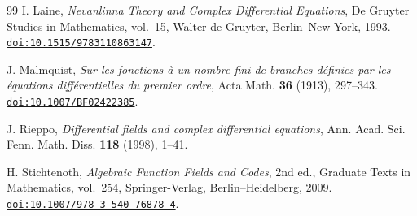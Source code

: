 \documentclass[11pt,reqno]{amsart}
\numberwithin{equation}{section}
\theoremstyle{definition}
\theoremstyle{remark}
\newcommand{\doi}[1]{\href{https://doi.org/#1}{\nolinkurl{doi:#1}}}
\begin{document}
\begin{thebibliography}{99}
I. Laine,
\emph{Nevanlinna Theory and Complex Differential Equations},
De Gruyter Studies in Mathematics, vol.~15, Walter de Gruyter,
Berlin--New York, 1993.
\doi{10.1515/9783110863147}.

J. Malmquist,
\emph{Sur les fonctions \`a un nombre fini de branches d\'efinies par les
\'equations diff\'erentielles du premier ordre},
Acta Math. \textbf{36} (1913), 297--343.
\doi{10.1007/BF02422385}.

J. Rieppo,
\emph{Differential fields and complex differential equations},
Ann. Acad. Sci. Fenn. Math. Diss. \textbf{118} (1998), 1--41.

H. Stichtenoth,
\emph{Algebraic Function Fields and Codes}, 2nd ed.,
Graduate Texts in Mathematics, vol.~254,
Springer-Verlag, Berlin--Heidelberg, 2009.
\doi{10.1007/978-3-540-76878-4}.

\end{thebibliography}
\end{document}
